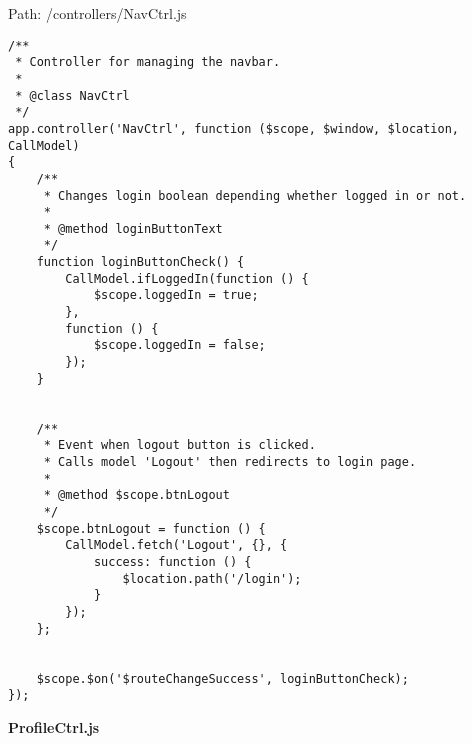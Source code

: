 Path: /controllers/NavCtrl.js
{\scriptsize
\begin{lstlisting}
/**
 * Controller for managing the navbar.
 *
 * @class NavCtrl
 */
app.controller('NavCtrl', function ($scope, $window, $location, CallModel)
{
	/**
	 * Changes login boolean depending whether logged in or not.
	 *
	 * @method loginButtonText
	 */
	function loginButtonCheck() {
		CallModel.ifLoggedIn(function () {
			$scope.loggedIn = true;
		},
		function () {
			$scope.loggedIn = false;
		});
	}


	/**
	 * Event when logout button is clicked.
	 * Calls model 'Logout' then redirects to login page.
	 *
	 * @method $scope.btnLogout
	 */
	$scope.btnLogout = function () {
		CallModel.fetch('Logout', {}, {
			success: function () {
				$location.path('/login');
			}
		});
	};


	$scope.$on('$routeChangeSuccess', loginButtonCheck);
});\end{lstlisting}
}
\textbf{ProfileCtrl.js}\label{ProfileCtrl.js}

